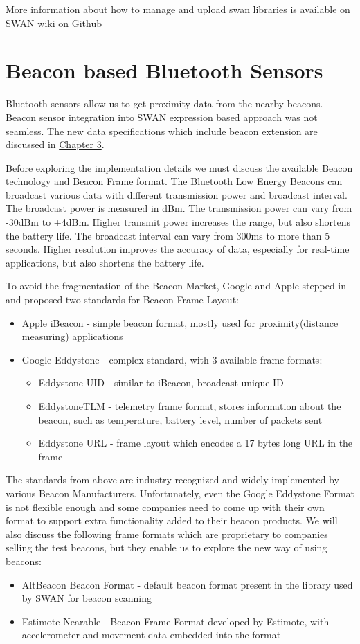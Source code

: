 More information about how to manage and upload swan libraries is available on SWAN wiki on Github\cite{swanWiki}

\section{Beacon based Bluetooth Sensors}

Bluetooth sensors allow us to get proximity data from the nearby beacons. Beacon sensor integration into SWAN expression based approach was not seamless.
The new data specifications which include beacon extension are discussed in \hyperref[Chapter3]{Chapter 3}.

Before exploring the implementation details we must discuss the available Beacon technology and Beacon Frame format.
The Bluetooth Low Energy Beacons can broadcast various data with different transmission power and broadcast interval.
The broadcast power is measured in dBm\cite{dbiRef}. The transmission power can vary from -30dBm to +4dBm. Higher transmit power
increases the range, but also shortens the battery life. The broadcast interval can vary from 300ms to more than 5 seconds. Higher resolution improves the accuracy of data,
especially for real-time applications, but also shortens the battery life.

To avoid the fragmentation of the Beacon Market, Google and Apple stepped in and proposed two standards for Beacon Frame Layout:
\begin{itemize}
 \item Apple iBeacon - simple beacon format, mostly used for proximity(distance measuring) applications
 \item Google Eddystone - complex standard, with 3 available frame formats:
 \begin{itemize}
  \item Eddystone UID - similar to iBeacon, broadcast unique ID
  \item EddystoneTLM - telemetry frame format, stores information about the beacon, such as temperature, battery level, number of packets sent
  \item Eddystone URL - frame layout which encodes a 17 bytes long URL in the frame
 \end{itemize}
\end{itemize}

The standards from above are industry recognized and widely implemented by various Beacon Manufacturers.
Unfortunately, even the Google Eddystone Format is not flexible enough and some companies need to come up with their own format to support extra functionality 
added to  their beacon products. We will also discuss the following frame formats which are proprietary to companies selling the test beacons, but they enable us to explore the
new way of using beacons:
\begin{itemize}
 \item AltBeacon Beacon Format - default beacon format present in the library used by SWAN for beacon scanning
 \item Estimote Nearable - Beacon Frame Format developed by Estimote\cite{estimote_company}, with accelerometer and movement data embedded into the format
\end{itemize}

